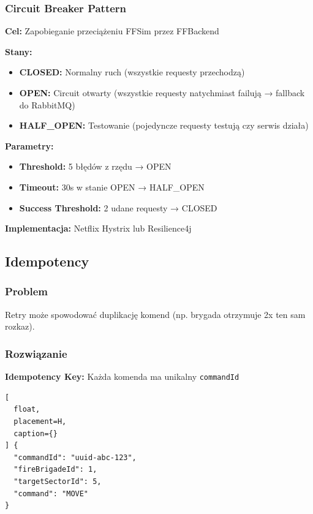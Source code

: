 \documentclass[11pt,a4paper] {article}
\begin{document}
\subsubsection{Circuit Breaker Pattern}

\textbf{Cel:} Zapobieganie przeciążeniu FFSim przez FFBackend

\textbf{Stany:}
\begin{itemize}
    \item \textbf{CLOSED:} Normalny ruch (wszystkie requesty przechodzą)
    \item \textbf{OPEN:} Circuit otwarty (wszystkie requesty natychmiast failują → fallback do RabbitMQ)
    \item \textbf{HALF\_OPEN:} Testowanie (pojedyncze requesty testują czy serwis działa)
\end{itemize}

\textbf{Parametry:}
\begin{itemize}
    \item \textbf{Threshold:} 5 błędów z rzędu → OPEN
    \item \textbf{Timeout:} 30s w stanie OPEN → HALF\_OPEN
    \item \textbf{Success Threshold:} 2 udane requesty → CLOSED
\end{itemize}

\textbf{Implementacja:} Netflix Hystrix lub Resilience4j

\subsection{Idempotency}

\subsubsection{Problem}

Retry może spowodować duplikację komend (np. brygada otrzymuje 2x ten sam rozkaz).

\subsubsection{Rozwiązanie}

\textbf{Idempotency Key:} Każda komenda ma unikalny \texttt{commandId}

\begin{lstlisting}[
  float,
  placement=H,
  caption={}
] {
  "commandId": "uuid-abc-123",
  "fireBrigadeId": 1,
  "targetSectorId": 5,
  "command": "MOVE"
}
\end{lstlisting}
\end{document}
